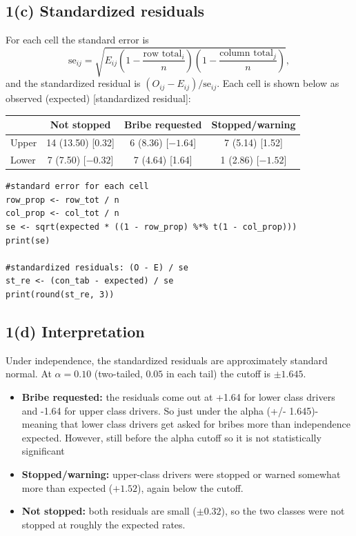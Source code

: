 \documentclass[11pt]{article}
\begin{document}
\subsection*{1(c) Standardized residuals}

For each cell the standard error is
\[
\mathrm{se}_{ij} = \sqrt{E_{ij}\left(1 - \frac{\text{row total}_i}{n}\right)\left(1 - \frac{\text{column total}_j}{n}\right)},
\]
and the standardized residual is $(O_{ij} - E_{ij})/\mathrm{se}_{ij}$. Each cell is shown below as observed (expected) [standardized residual]:

\begin{center}
\begin{tabular}{lccc}
\toprule
 & Not stopped & Bribe requested & Stopped/warning \\
\midrule
Upper & 14 (13.50) [0.32] & 6 (8.36) [$-1.64$] & 7 (5.14) [1.52] \\
Lower & 7 (7.50) [$-0.32$] & 7 (4.64) [1.64] & 1 (2.86) [$-1.52$] \\
\bottomrule
\end{tabular}
\end{center}

\begin{lstlisting}
#standard error for each cell 
row_prop <- row_tot / n
col_prop <- col_tot / n
se <- sqrt(expected * ((1 - row_prop) %*% t(1 - col_prop)))
print(se)

#standardized residuals: (O - E) / se
st_re <- (con_tab - expected) / se
print(round(st_re, 3))
\end{lstlisting}

\subsection*{1(d) Interpretation}

Under independence, the standardized residuals are approximately standard normal. At $\alpha = 0.10$ (two-tailed, $0.05$ in each tail) the cutoff is $\pm 1.645$.

\begin{itemize}
  \item \textbf{Bribe requested:} the residuals come out at +1.64 for lower class drivers and -1.64 for upper class drivers. So just under the alpha (+/- 1.645)- meaning that lower class drivers get asked for bribes more than independence expected. However, still before the alpha cutoff so it is not statistically significant
  \item \textbf{Stopped/warning:} upper-class drivers were stopped or warned somewhat more than expected ($+1.52$), again below the cutoff.
  \item \textbf{Not stopped:} both residuals are small ($\pm 0.32$), so the two classes were not stopped at roughly the expected rates.
\end{itemize}
\end{document}

